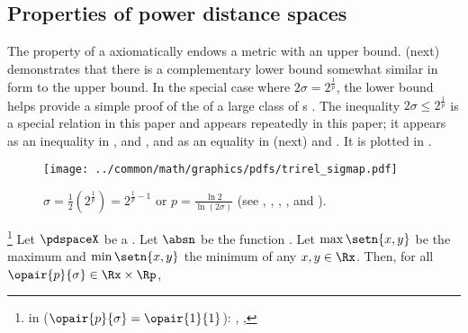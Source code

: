 \subsection{Properties of power distance spaces}
\label{sec:pdspace_propd}
The  property of a 
axiomatically endows a metric with an upper bound. 
 (next) demonstrates that there is a complementary lower bound 
somewhat similar in form to the  upper bound.
In the special case where $2\sigma=2^\frac{1}{p}$, 
the lower bound helps provide a simple proof of the  of 
a large class of s .
The inequality $2\sigma\le2^\frac{1}{p}$ is a special relation in this paper and appears repeatedly in this paper;
it appears as an inequality in ,  and ,
and as an equality in  (next) and .
It is plotted in .
\begin{figure}[t]
  \footnotesize%
  \centering%
  \texttt{[image: ../common/math/graphics/pdfs/trirel\_sigmap.pdf]}
  \caption{$\sigma = \frac{1}{2}(2^{\frac{1}{p}}) = 2^{\frac{1}{p}-1}$ or $p=\frac{\ln2}{\ln(2\sigma)}$ 
  \label{fig:sigmap}
  \scs(see , , , , and ).
  }
\end{figure}
\begin{lemma}
\footnote{
  in  ($\opair{p}{\sigma}=\opair{1}{1}$):
  ,
  ,
  }
\label{lem:pdspace_ineq}
Let $\pdspaceX$ be a  . 
Let $\absn$ be the  function .
Let $\max\setn{x,y}$ be the maximum and $\min\setn{x,y}$ the minimum of any $x,y\in\Rx$.
Then, for all $\opair{p}{\sigma}\in\Rx\times\Rp$,
\end{lemma}

